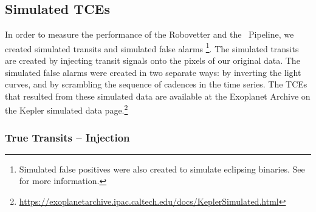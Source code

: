 \subsection{Simulated TCEs}
\label{s:simulated}
In order to measure the performance of the Robovetter and the \Kepler\ Pipeline, we created simulated transits and simulated false alarms \footnote{Simulated false positives were also created to simulate eclipsing binaries. See \citet{Coughlin2017a} for more information.}. The simulated transits are created by injecting transit signals onto the pixels of our original data. The simulated false alarms were created in two separate ways: by inverting the light curves, and by scrambling the sequence of cadences in the time series. The TCEs that resulted from these simulated data are available at the Exoplanet Archive on the Kepler simulated data page.\footnote{\url{https://exoplanetarchive.ipac.caltech.edu/docs/KeplerSimulated.html}}


\subsubsection{True Transits -- Injection}
\label{injectsec}

